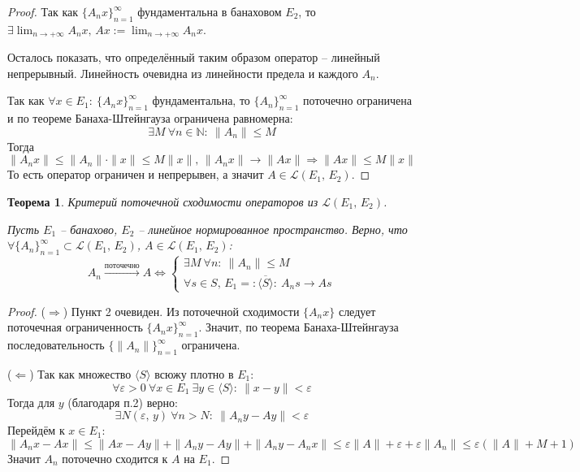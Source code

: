 \documentclass[a4paper,12pt]{article}
\renewcommand{\leq}{\ensuremath{\leqslant}}
\theoremstyle{plain}
\newtheorem{theorem}{Теорема}[section]
\theoremstyle{definition}
\theoremstyle{remark}
\begin{document}
\begin{proof}
	Так как $\{A_nx\}_{n=1}^\infty$ фундаментальна в банаховом $E_2$, то $\exists \lim_{n \to +\infty} A_nx,\, Ax := \lim_{n \to +\infty}A_nx$.

	Осталось показать, что определённый таким образом оператор -- линейный непрерывный. Линейность очевидна из линейности предела и каждого $A_n$.

	Так как $\forall x \in E_1 :\: \{A_nx\}_{n=1}^\infty$ фундаментальна, то $\{A_n\}_{n=1}^\infty$ поточечно ограничена и по теореме Банаха-Штейнгауза ограничена равномерна:
	\[
		\exists M \: \forall n \in \mathbb{N} :\: \|A_n\| \leq M
	\]
	Тогда
	\[
		\|A_nx\| \leq \|A_n\|\cdot\|x\| \leq M\|x\|,\, \|A_nx\| \to \|Ax\| \Rightarrow \|Ax\| \leq M\|x\|
	\]
	То есть оператор ограничен и непрерывен, а значит $A \in \mathcal{L}(E_1,\, E_2)$.
\end{proof}

\begin{theorem}
	Критерий поточечной сходимости операторов из $\mathcal{L}(E_1,\,E_2)$.

	Пусть $E_1$ -- банахово, $E_2$ -- линейное нормированное пространство. Верно, что $\forall \{A_n\}_{n=1}^\infty \subset \mathcal{L}(E_1,\,E_2)$, $A \in \mathcal{L}(E_1,\,E_2)$:
	\[
		A_n \overset{\text{поточечно}}{\to} A \Leftrightarrow \begin{cases}
			\exists M \: \forall n :\: \|A_n\| \leq M \\
			\forall s \in S,\, E_1 =: \overline{\langle S\rangle}  :\: A_ns \to As
		\end{cases}
	\]
\end{theorem}

\begin{proof}
	($\Rightarrow$) Пункт 2 очевиден. Из поточечной сходимости $\{A_nx\}$ следует поточечная ограниченность $\{A_nx\}_{n=1}^\infty$. Значит, по теорема Банаха-Штейнгауза последовательность $\{\|A_n\|\}_{n=1}^\infty$ ограничена.

	($\Leftarrow$) Так как множество $\langle S\rangle$ всюжу плотно в $E_1$:
	\[
		\forall \varepsilon > 0 \: \forall x \in E_1 \: \exists y \in \langle S\rangle :\: \|x - y\| < \varepsilon
	\]
	Тогда для $y$ (благодаря п.2) верно:
	\[
		\exists N(\varepsilon,\, y) \: \forall n > N :\: \|A_ny - Ay\| < \varepsilon
	\]
	Перейдём к $x \in E_1$:
	\[
		\|A_nx - Ax\| \leq \|Ax - Ay\| + \|A_ny - Ay\| + \|A_ny - A_nx\| \leq \varepsilon\|A\| + \varepsilon + \varepsilon\|A_n\| \leq \varepsilon(\|A\| + M + 1)
	\]
	Значит $A_n$ поточечно сходится к $A$ на $E_1$.
\end{proof}
\end{document}
